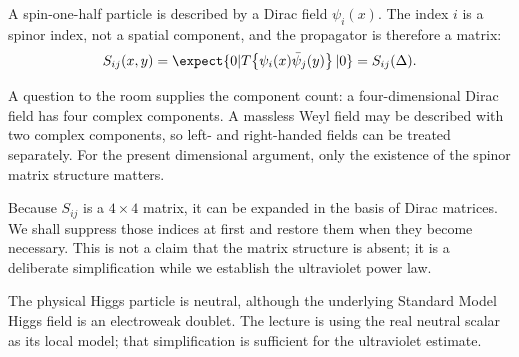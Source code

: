 \begin{classroomqa}
\end{classroomqa}

A spin-one-half particle is described by a Dirac field \(\psi_i(x)\). The index \(i\) is a spinor index, not a spatial component, and the propagator is therefore a matrix:
\begin{equation}
S_{ij}(x,y)=\expect{0|T\!\left\{\psi_i(x)\bar\psi_j(y)\right\}|0}
=S_{ij}(\Delta).
\end{equation}

A question to the room supplies the component count: a four-dimensional Dirac field has four complex components. A massless Weyl field may be described with two complex components, so left- and right-handed fields can be treated separately. For the present dimensional argument, only the existence of the spinor matrix structure matters.

Because \(S_{ij}\) is a \(4\times4\) matrix, it can be expanded in the basis of Dirac matrices. We shall suppress those indices at first and restore them when they become necessary. This is not a claim that the matrix structure is absent; it is a deliberate simplification while we establish the ultraviolet power law.

\begin{classroomqa}
\end{classroomqa}

The physical Higgs particle is neutral, although the underlying Standard Model Higgs field is an electroweak doublet. The lecture is using the real neutral scalar as its local model; that simplification is sufficient for the ultraviolet estimate.

